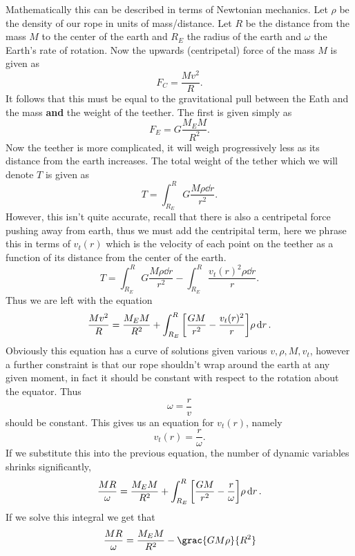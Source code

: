 \documentclass[12pt]{article}
\begin{document}
Mathematically this can be described in terms of Newtonian mechanics. Let $\rho$ be the density of our rope in units of mass/distance. Let $R$ be the distance from the mass $M$ to the center of the earth and $R_E$ the radius of the earth and $\omega$ the Earth's rate of rotation. Now the upwards (centripetal) force of the mass $M$ is given as 
\[
  F_C = \frac{Mv^2}{R}.
\]  
It follows that this must be equal to the gravitational pull between the Eath and the mass \textbf{and} the weight of the teether. The first is given simply as 
\[
  F_E = G \frac{M_E M}{R^2}.
\]
Now the teether is more complicated, it will weigh progressively less as its distance from the earth increases. The total weight of the tether which we will denote $T$ is given as 
\[
  T = \int_{R_E}^R G \frac{M \rho \dd{r}}{r^2}.
\]
However, this isn't quite accurate, recall that there is also a centripetal force pushing away from earth, thus we must add the centripital term, here we phrase this in terms of $v_t(r)$ which is the velocity of each point on the teether as a function of its distance from the center of the earth. 
\[
 T = \int_{R_E}^R G \frac{M \rho \dd{r}}{r^2} - \int_{R_E}^R \frac{v_t(r)^2\rho \dd{r}}{r}.
\]
Thus we are left with the equation 
\[
  \frac{Mv^2}{R} =  \frac{M_E M}{R^2} + \int_{R_E}^R \qty[ \frac{GM}{r^2} - \frac{v_t(r)^2}{r}] \rho \dd{r}.
\]
Obviously this equation has a curve of solutions given various $v, \rho, M, v_t$, however a further constraint is that our rope shouldn't wrap around the earth at any given moment, in fact it should be constant with respect to the rotation about the equator. Thus 
\[
  \omega = \frac{r}{v}
\]
should be constant. This gives us an equation for $v_t(r)$, namely 
\[
  v_t(r) = \frac{r}{\omega}.
\] 
If we substitute this into the previous equation, the number of dynamic variables shrinks significantly, 
\[
  \frac{MR}{\omega} =  \frac{M_E M}{R^2} + \int_{R_E}^R \qty[ \frac{GM}{r^2} - \frac{r}{\omega}] \rho \dd{r}.
\]
If we solve this integral we get that 
\[
  \frac{MR}{\omega} =  \frac{M_E M}{R^2} - \grac{GM\rho}{R^2}
\]
\end{document}
